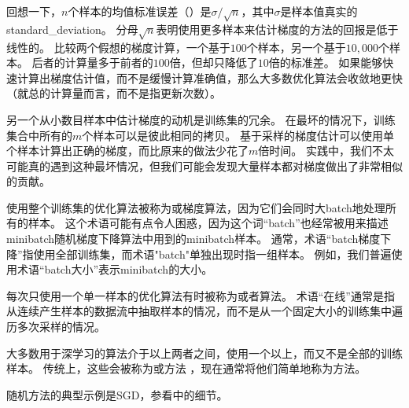 回想一下，$n$个样本的均值标准误差（）是$\sigma/\sqrt{n}$，其中$\sigma$是样本值真实的\gls{standard_deviation}。
分母$\sqrt{n}$表明使用更多样本来估计梯度的方法的回报是低于线性的。
比较两个假想的梯度计算，一个基于$100$个样本，另一个基于$10,000$个样本。
后者的计算量多于前者的$100$倍，但却只降低了$10$倍的标准差。
如果能够快速计算出梯度估计值，而不是缓慢计算准确值，那么大多数优化算法会收敛地更快（就总的计算量而言，而不是指更新次数）。

另一个从小数目样本中估计梯度的动机是训练集的冗余。
在最坏的情况下，训练集合中所有的$m$个样本可以是彼此相同的拷贝。
基于采样的梯度估计可以使用单个样本计算出正确的梯度，而比原来的做法少花了$m$倍时间。
实践中，我们不太可能真的遇到这种最坏情况，但我们可能会发现大量样本都对梯度做出了非常相似的贡献。

使用整个训练集的优化算法被称为或梯度算法，因为它们会同时大\gls{batch}地处理所有的样本。
这个术语可能有点令人困惑，因为这个词``\gls{batch}''也经常被用来描述\gls{minibatch}随机梯度下降算法中用到的\gls{minibatch}样本。
通常，术语``\gls{batch}梯度下降''指使用全部训练集，而术语"\gls{batch}"单独出现时指一组样本。
例如，我们普遍使用术语``\gls{batch}大小''表示\gls{minibatch}的大小。

每次只使用一个单一样本的优化算法有时被称为或者算法。
术语``在线''通常是指从连续产生样本的数据流中抽取样本的情况，而不是从一个固定大小的训练集中遍历多次采样的情况。


大多数用于深学习的算法介于以上两者之间，使用一个以上，而又不是全部的训练样本。
传统上，这些会被称为或方法 ，现在通常将他们简单地称为方法。

随机方法的典型示例是\gls{SGD}，参看中的细节。

